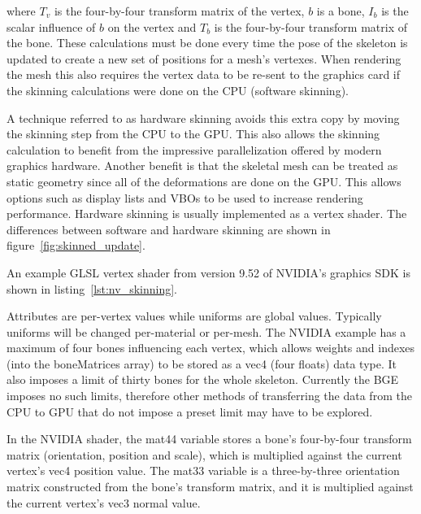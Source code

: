 where $T_v$ is the four-by-four transform matrix of the vertex, $b$ is a bone, $I_b$ is the scalar influence of $b$ on the vertex and $T_b$ is the four-by-four transform matrix of the bone.
These calculations must be done every time the pose of the skeleton is updated to create a new set of positions for a mesh's vertexes.
When rendering the mesh this also requires the vertex data to be re-sent to the graphics card if the skinning calculations were done on the CPU (software skinning).

A technique referred to as hardware skinning avoids this extra copy by moving the skinning step from the CPU to the GPU.
This also allows the skinning calculation to benefit from the impressive parallelization offered by modern graphics hardware.
Another benefit is that the skeletal mesh can be treated as static geometry since all of the deformations are done on the GPU.
This allows options such as display lists and VBOs to be used to increase rendering performance.
Hardware skinning is usually implemented as a vertex shader.
The differences between software and hardware skinning are shown in figure~\ref{fig:skinned_update}.


An example GLSL vertex shader from version 9.52 of NVIDIA's graphics SDK\cite{nvidiasdk} is shown in listing~\ref{lst:nv_skinning}.


Attributes are per-vertex values while uniforms are global values.
Typically uniforms will be changed per-material or per-mesh.
The NVIDIA example has a maximum of four bones influencing each vertex, which allows weights and indexes (into the boneMatrices array) to be stored as a vec4 (four floats) data type.
It also imposes a limit of thirty bones for the whole skeleton.
Currently the BGE imposes no such limits, therefore other methods of transferring the data from the CPU to GPU that do not impose a preset limit may have to be explored.

In the NVIDIA shader, the mat44 variable stores a bone's four-by-four transform matrix (orientation, position and scale), which is multiplied against the current vertex's vec4 position value.
The mat33 variable is a three-by-three orientation matrix constructed from the bone's transform matrix, and it is multiplied against the current vertex's vec3 normal value.


